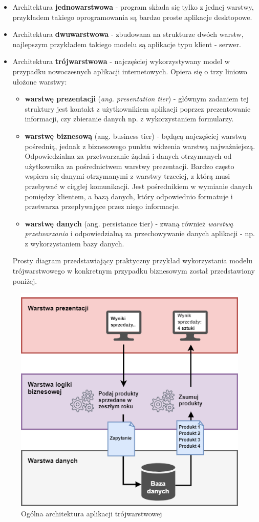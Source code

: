\begin{itemize}
    \item Architektura \textbf{jednowarstwowa} - program składa się tylko z jednej warstwy, przykładem takiego oprogramowania są bardzo proste aplikacje desktopowe.
    \item Architektura \textbf{dwuwarstwowa} - zbudowana na strukturze dwóch warstw, najlepszym przykładem takiego modelu są aplikacje typu klient - serwer.
    \item Architektura \textbf{trójwarstwowa} - najczęściej wykorzystywany model w przypadku nowoczesnych aplikacji internetowych. Opiera się o trzy liniowo ułożone warstwy:
        \begin{itemize}
            \item \textbf{warstwę prezentacji} (\textit{ang. presentation tier}) - głównym zadaniem tej struktury jest kontakt z użytkownikiem aplikacji poprzez prezentowanie informacji, czy zbieranie danych np. z wykorzystaniem formularzy.
            \item \textbf{warstwę biznesową} (ang. business tier) - będącą najczęściej warstwą pośrednią, jednak z biznesowego punktu widzenia warstwą najważniejszą. Odpowiedzialna za przetwarzanie żądań i danych otrzymanych od użytkownika za pośrednictwem warstwy prezentacji. Bardzo często wspiera się danymi otrzymanymi z warstwy trzeciej, z którą musi przebywać w ciągłej komunikacji. Jest pośrednikiem w wymianie danych pomiędzy klientem, a bazą danych, który odpowiednio formatuje i przetwarza przepływające przez niego informacje.
            \item \textbf{warstwę danych} (ang. persistance tier) - zwaną również \textit{warstwą przetwarzania} i odpowiedzialną za przechowywanie danych aplikacji - np. z wykorzystaniem bazy danych.
        \end{itemize}
    Prosty diagram przedstawiający praktyczny przykład wykorzystania modelu trójwarstwowego w konkretnym przypadku biznesowym został przedstawiony poniżej.
\end{itemize}

\begin{figure}[ht]
	\centering
	\includegraphics[width=0.7\linewidth]{graphics/three-tier-architecture.png}
	\caption{Ogólna architektura aplikacji trójwarstwowej}
	\label{three-tier-architecture}
\end{figure}


